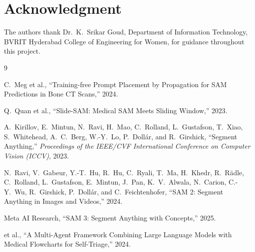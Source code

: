 \documentclass[11pt,a4paper]{article}
\begin{document}
\section*{Acknowledgment}
The authors thank Dr.\ K.\ Srikar Goud, Department of Information Technology, BVRIT Hyderabad College of Engineering for Women, for guidance throughout this project.

\begin{thebibliography}{9}

C.\ Meg et al., ``Training-free Prompt Placement by Propagation for SAM Predictions in Bone CT Scans,'' 2024.

Q.\ Quan et al., ``Slide-SAM: Medical SAM Meets Sliding Window,'' 2023.

A.\ Kirillov, E.\ Mintun, N.\ Ravi, H.\ Mao, C.\ Rolland, L.\ Gustafson, T.\ Xiao, S.\ Whitehead, A.\ C.\ Berg, W.-Y.\ Lo, P.\ Doll\'ar, and R.\ Girshick, ``Segment Anything,'' \emph{Proceedings of the IEEE/CVF International Conference on Computer Vision (ICCV)}, 2023.

N.\ Ravi, V.\ Gabeur, Y.-T.\ Hu, R.\ Hu, C.\ Ryali, T.\ Ma, H.\ Khedr, R.\ R\"adle, C.\ Rolland, L.\ Gustafson, E.\ Mintun, J.\ Pan, K.\ V.\ Alwala, N.\ Carion, C.-Y.\ Wu, R.\ Girshick, P.\ Doll\'ar, and C.\ Feichtenhofer, ``SAM 2: Segment Anything in Images and Videos,'' 2024.

Meta AI Research, ``SAM 3: Segment Anything with Concepts,'' 2025.

et al., ``A Multi-Agent Framework Combining Large Language Models with Medical Flowcharts for Self-Triage,'' 2024.

\end{thebibliography}
\end{document}
